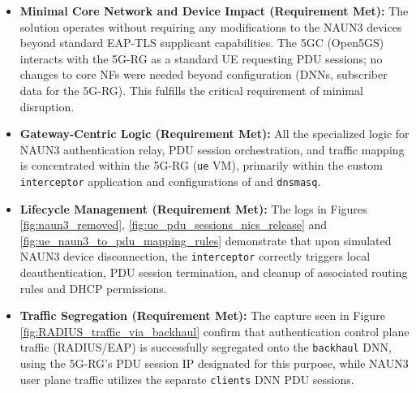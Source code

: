 \begin{itemize}
    \item \textbf{Minimal Core Network and Device Impact (Requirement Met):} The solution operates without requiring any modifications to the \ac{NAUN3} devices beyond standard \ac{EAP-TLS} supplicant capabilities. The \ac{5GC} (Open5GS) interacts with the \ac{5G-RG} as a standard \ac{UE} requesting \ac{PDU} sessions; no changes to core \acp{NF} were needed beyond configuration (\acp{DNN}, subscriber data for the \ac{5G-RG}). This fulfills the critical requirement of minimal disruption.

    \item \textbf{Gateway-Centric Logic (Requirement Met):} All the specialized logic for \ac{NAUN3} authentication relay, \ac{PDU} session orchestration, and traffic mapping is concentrated within the \ac{5G-RG} (\texttt{ue} \ac{VM}), primarily within the custom \texttt{interceptor} application and configurations of  and \texttt{dnsmasq}.

    \item \textbf{Lifecycle Management (Requirement Met):} The logs in Figures \ref{fig:naun3_removed}, \ref{fig:ue_pdu_sessions_nics_release} and \ref{fig:ue_naun3_to_pdu_mapping_rules} demonstrate that upon simulated \ac{NAUN3} device disconnection, the \texttt{interceptor} correctly triggers local deauthentication, \ac{PDU} session termination, and cleanup of associated routing rules and \ac{DHCP} permissions.

    \item \textbf{Traffic Segregation (Requirement Met):} The capture seen in Figure \ref{fig:RADIUS_traffic_via_backhaul} confirm that authentication control plane traffic (\ac{RADIUS}/\ac{EAP}) is successfully segregated onto the \texttt{backhaul} \ac{DNN}, using the \ac{5G-RG}'s \ac{PDU} session \ac{IP} designated for this purpose, while \ac{NAUN3} user plane traffic utilizes the separate \texttt{clients} \ac{DNN} \ac{PDU} sessions.
\end{itemize}
